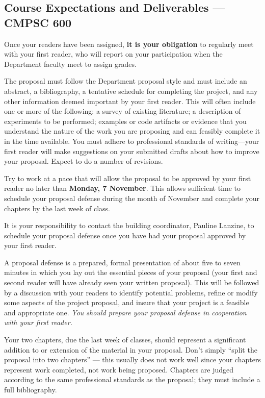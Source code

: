 \subsection*{Course Expectations and Deliverables --- CMPSC 600}

\medskip
{}
Once your readers have been assigned,
{\bf it is your obligation} to regularly meet with your first reader,
who will report on your participation when the Department faculty
meet to assign grades.

\medskip
{}
The proposal  must follow the Department proposal style and must include
an abstract, a bibliography, a tentative schedule for completing the
project, and any other information deemed important by your first
reader. This will often include one or more of the following:
a survey of existing literature;
a description of experiments to be performed;
examples or code artifacts or evidence that you understand the
nature of the work you are proposing and can feasibly complete it
in the time available. You must adhere to professional standards of
writing---your first reader will make suggestions on your submitted
drafts about how to improve your proposal.
Expect to do a number of revisions.

Try to work at a pace that will allow the proposal to be approved by your 
first reader no later than {\bf Monday, 7 November}. 
This allows sufficient time to schedule your proposal defense during
the month of November and complete your chapters by the last week of class.

\medskip
{}
It is your responsibility to contact the building coordinator, Pauline
Lanzine, to schedule your proposal defense
once you have had your proposal approved by your first reader.

A proposal defense is a prepared, formal presentation of about five to
seven minutes in which you lay out the essential pieces of your proposal
(your first and second reader will have already seen your written
proposal). This will be followed by a discussion with your readers to
identify potential problems, refine or modify some aspects of the
project proposal, and insure that your project is a feasible and
appropriate one. {\em You should prepare your proposal defense in
cooperation with your first reader.}

\medskip
{} Your two chapters, due the last week 
of classes, should represent 
a significant addition to or extension of the material
in your proposal. Don't simply ``split the proposal into two chapters'' ---
this usually does not work well since
your chapters 
represent work completed, not work being proposed. Chapters are judged
according to the same professional standards as the proposal; they must
include a full bibliography.


